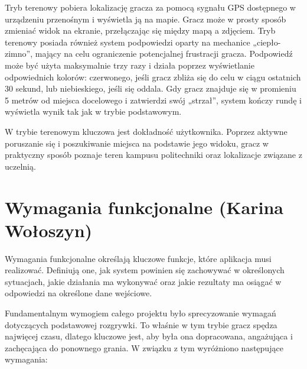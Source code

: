 Tryb terenowy pobiera lokalizację gracza za pomocą sygnału GPS dostępnego w urządzeniu przenośnym i wyświetla ją na mapie. Gracz może w prosty sposób zmieniać widok na ekranie, przełączając się między mapą a zdjęciem. Tryb terenowy posiada również system podpowiedzi oparty na mechanice „ciepło-zimno”, mający na celu ograniczenie potencjalnej frustracji gracza. Podpowiedź może być użyta maksymalnie trzy razy i działa poprzez wyświetlanie odpowiednich kolorów: czerwonego, jeśli gracz zbliża się do celu w ciągu ostatnich 30 sekund, lub niebieskiego, jeśli się oddala. Gdy gracz znajduje się w promieniu 5 metrów od miejsca docelowego i zatwierdzi swój „strzał”, system kończy rundę i wyświetla wynik tak jak w trybie podstawowym.

W trybie terenowym kluczowa jest dokładność użytkownika. Poprzez aktywne poruszanie się i poszukiwanie miejsca na podstawie jego widoku, gracz w praktyczny sposób poznaje teren kampusu politechniki oraz lokalizacje związane z uczelnią.


\section{Wymagania funkcjonalne (Karina Wołoszyn)}

Wymagania funkcjonalne określają kluczowe funkcje, które aplikacja musi realizować. Definiują one, jak system powinien się zachowywać w określonych sytuacjach, jakie działania ma wykonywać oraz jakie rezultaty ma osiągać w odpowiedzi na określone dane wejściowe.

Fundamentalnym wymogiem całego projektu było sprecyzowanie wymagań dotyczących podstawowej rozgrywki. To właśnie w tym trybie gracz spędza najwięcej czasu, dlatego kluczowe jest, aby była ona dopracowana, angażująca i zachęcająca do ponownego grania. W związku z tym wyróżniono następujące wymagania:

